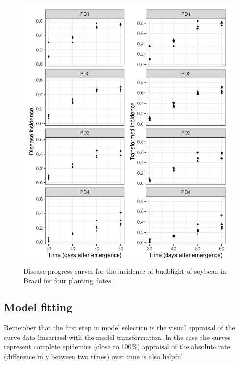 \documentclass[
  letterpaper,
  DIV=11,
  numbers=noendperiod]{scrreprt}
\begin{document}
\begin{figure}[H]

{\centering \includegraphics{temporal-fitting_files/figure-pdf/fig-bud1-1.pdf}

}

\caption{\label{fig-bud1}Disease progress curves for the incidence of
budblight of soybean in Brazil for four planting dates}

\end{figure}

\hypertarget{model-fitting-1}{%
\subsection{Model fitting}\label{model-fitting-1}}

Remember that the first step in model selection is the visual appraisal
of the curve data linearized with the model transformation. In the case
the curves represent complete epidemics (close to 100\%) appraisal of
the absolute rate (difference in y between two times) over time is also
helpful.
\end{document}
